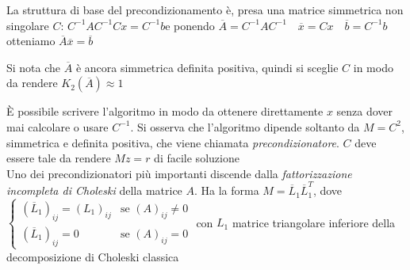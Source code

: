 \documentclass[openany]{book}
\begin{document}
La struttura di base del precondizionamento è, presa una matrice simmetrica non singolare $C$: $C^{-1}AC^{-1}Cx=C^{-1}b$\quad e ponendo $\overline{A}=C^{-1}AC^{-1} \quad \overline{x}=Cx \quad \overline{b}=C^{-1}b$\quad otteniamo $\overline{A}\overline{x}=\overline{b}$

Si nota che $\overline{A}$ è ancora simmetrica definita positiva, quindi si sceglie $C$ in modo da rendere $K_2(\overline{A})\approx 1$

È possibile scrivere l'algoritmo in modo da ottenere direttamente $x$ senza dover mai calcolare o usare $C^{-1}$. Si osserva che l'algoritmo dipende soltanto da $M=C^2$, simmetrica e definita positiva, che viene chiamata \textit{precondizionatore}. $C$ deve essere tale da rendere $Mz=r$ di facile soluzione 
\\

Uno dei precondizionatori più importanti discende dalla \textit{fattorizzazione incompleta di Choleski} della matrice $A$. Ha la forma $M=\overline{L}_1\overline{L}_1^T$, dove
$\left\{ \begin{array}{ll}(\overline{L}_1)_{ij}=(L_1)_{ij} & \text{se } (A)_{ij}\neq 0 \\ (\overline{L}_1)_{ij}=0 & \text{se } (A)_{ij}=0\end{array} \right.$ con $L_1$ matrice triangolare inferiore della decomposizione di Choleski classica
\end{document}
